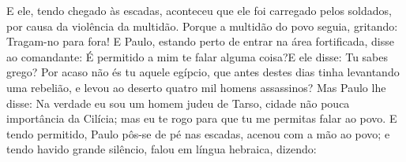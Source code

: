 {  E ele, tendo chegado às escadas, aconteceu que ele foi carregado pelos soldados, por causa da violência da multidão.
  Porque a multidão do povo
{} seguia, gritando: Tragam-no para fora!
  E Paulo, estando perto de entrar na área fortificada, disse ao comandante: É permitido a mim te falar alguma coisa?E ele disse: Tu sabes grego?
  Por acaso não és tu aquele egípcio, que antes destes dias tinha levantando uma rebelião, e levou ao deserto quatro mil homens assassinos?
  Mas Paulo lhe disse: Na verdade eu sou um homem judeu de Tarso, cidade não pouca importância da Cilícia; mas eu te rogo para que tu me permitas falar ao povo.
  E tendo
{} permitido, Paulo pôs-se de pé nas escadas, acenou com a mão ao povo; e tendo havido grande silêncio, falou
{} em língua hebraica, dizendo:
\par }

